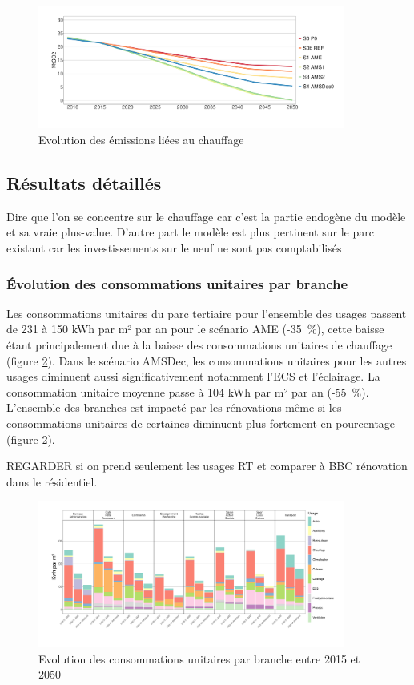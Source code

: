 \documentclass[10.5pt,a4paper]{article}
\begin{document}
{\begin{figure}[h!]
\centering 
\caption{Evolution des émissions liées au chauffage}\label{Evol_Em_Chauff-1}  
\includegraphics[width = 0.9\textwidth]{Evol_Em_Chauff-1}  
\end{figure}

\clearpage

\subsection{Résultats détaillés}

Dire que l'on se concentre sur le chauffage car c'est la partie endogène du modèle et sa vraie plus-value. 
D'autre part le modèle est plus pertinent sur le parc existant car les investissements sur le neuf ne sont pas comptabilisés 

\subsubsection{Évolution des consommations unitaires par branche}

Les consommations unitaires du parc tertiaire pour l'ensemble des usages passent de 231 à 150 kWh par m² par an pour le scénario AME (-35~\%), cette baisse étant principalement due à la baisse des consommations unitaires de chauffage (figure \ref{Conso_u_branche_2050-1}). Dans le scénario AMSDec, les consommations unitaires pour les autres usages diminuent aussi significativement notamment l'ECS et l'éclairage. La consommation unitaire moyenne passe à 104 kWh par m² par an (-55~\%). L'ensemble des branches est impacté par les rénovations même si les consommations unitaires de certaines diminuent plus fortement en pourcentage (figure \ref{Conso_u_branche_2050-1}).  

REGARDER si on prend seulement les usages RT et comparer à BBC rénovation dans le résidentiel. 


\begin{figure}[h!]
\centering 
\caption{Evolution des consommations unitaires par branche entre 2015 et 2050}\label{Conso_u_branche_2050-1}  
\includegraphics[width = 0.9\textwidth]{Conso_u_branche_2050-1}  
\end{figure}


}
\end{document}
